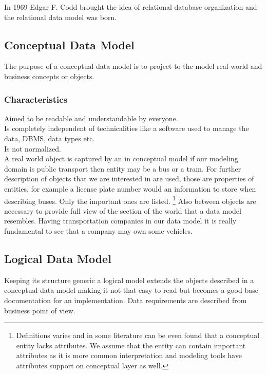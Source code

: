 In 1969 Edgar F. Codd \cite{Codd69} brought the idea of relational database organization and the relational data model was born. 

\subsection{Conceptual Data Model}

The purpose of a conceptual data model is to project to the model real-world and business concepts or objects. \\

\subsubsection{Characteristics}
Aimed to be readable and understandable by everyone. \\
Is completely independent of technicalities like a software used to manage the data, DBMS, data types etc. \\
Is not normalized. \\

A real world object is captured by an  in conceptual model if our modeling domain is public transport then entity may be a bus or a tram.
For further description of objects that we are interested in  are used, those are properties of entities, for example a license plate number would an information to store when describing buses. Only the important ones are listed. \footnote{Definitions varies and in some literature can be even found that a conceptual entity lacks attributes. We assume that the entity can contain important attributes as it is more common interpretation and modeling tools have attributes support on conceptual layer as well.}
Also  between objects are necessary to provide full view of the section of the world that a data model resembles. Having transportation companies in our data model it is really fundamental to see that a company may own some vehicles. \\

\subsection{Logical Data Model}

Keeping its structure generic a logical model extends the objects described in a conceptual data model making it not that easy to read but becomes a good base documentation for an implementation. Data requirements are described from business point of view.

